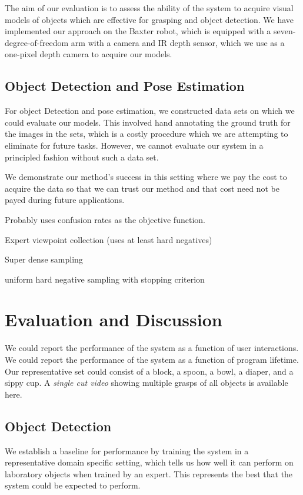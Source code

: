 \documentclass[conference]{IEEEtran}
\begin{document}
The aim of our evaluation is to assess the ability of the system to
acquire visual models of objects which are effective for grasping and
object detection.  We have implemented our approach on the Baxter
robot, which is equipped with a seven-degree-of-freedom arm with a
camera and IR depth sensor, which we use as a one-pixel depth camera
to acquire our models.

\subsection{Object Detection and Pose Estimation}

For object Detection and pose estimation, we constructed data sets on
which we could evaluate our models. This involved hand annotating the
ground truth for the images in the sets, which is a costly procedure
which we are attempting to eliminate for future tasks.  However, we
cannot evaluate our system in a principled fashion without such a data
set.

We demonstrate our method's success in this setting where we pay the cost
to acquire the data so that we can trust our method and that cost need not be 
payed during future applications. 

Probably uses confusion rates as the objective function.

Expert viewpoint collection (uses at least hard negatives)

Super dense sampling

uniform hard negative sampling with stopping criterion



\section{Evaluation and Discussion}

We could report the performance of the system as a function of user
interactions.  We could report the performance of the system as a
function of program lifetime.  Our representative set could consist of
a block, a spoon, a bowl, a diaper, and a sippy cup. A \emph{single
  cut video} showing multiple grasps of all objects is available here.

\subsection{Object Detection}

We establish a baseline for performance by training the system in a
representative domain specific setting, which tells us how well it can
perform on laboratory objects when trained by an expert. This
represents the best that the system could be expected to perform.
\end{document}
